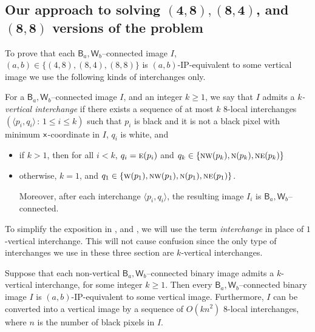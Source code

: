 \documentclass[lotsofwhite,charterfonts]{patmorin}
\newcommand{\N}{\textsc{n}}
\newcommand{\NE}{\textsc{ne}}
\newcommand{\E}{\textsc{e}}
\newcommand{\W}{\textsc{w}}
\newcommand{\NW}{\textsc{nw}}
\newcommand{\x}{\ensuremath{\protect\textup{\textsf{x}}}}
\newcommand{\ic}[2]{\langle #1,#2 \rangle}
\begin{document}
\subsection{Our approach to solving $\mathbf{(4,8), (8,4)}$, and
$\mathbf{(8,8)}$ versions of the problem}

To prove that each $\textsf{B}_a,\textsf{W}_b$--connected image $I$,
$(a,b)\in \{(4,8), (8,4), (8,8)\}$ is $(a,b)$-IP-equivalent to some
vertical image we use the following kinds of interchanges only.

For a $\textsf{B}_a,\textsf{W}_b$--connected image $I$, and an integer
$k\geq 1$, we say that $I$ admits a \emph{$k$-vertical interchange} if
there exists a sequence of at most $k$ $8$-local interchanges
$(\ic{p_i}{q_i}\, :\, 1\leq i\leq k)$ such that $p_i$ is black and it
is not a black pixel  with minimum \x-coordinate in $I$, $q_i$ is
white, and 

\begin{itemize} 

\item if $k>1$, then for all $i<k$, $q_i=\E(p_i)$ and
$q_k\in\{\NW(p_k),\N(p_k),\NE(p_k)\}$ 

\item otherwise, $k=1$, and
$q_1\in\{\W(p_1),\NW(p_1),\N(p_1),\NE(p_1)\}$.

Moreover, after each interchange $\ic{p_i}{q_i}$, the resulting
image $I_i$ is $\textsf{B}_a,\textsf{W}_b$--connected. 
\end{itemize}

To simplify the exposition in , 
and , we will use the term \emph{interchange} in
place of $1$-vertical interchange. This will not cause confusion since
the only type of interchanges we use in these three section are
$k$-vertical interchanges.

\begin{lem} 
Suppose that each non-vertical $\textsf{B}_a,\textsf{W}_b$--connected
binary image admits a $k$-vertical interchange, for some integer
$k\geq 1$. Then every $\textsf{B}_a,\textsf{W}_b$--connected binary
image $I$ is $(a,b)$-IP-equivalent to some vertical image.
Furthermore, $I$ can be converted into a vertical image by a sequence
of $O(kn^2)$ 8-local interchanges, where $n$ is the number of black
pixels in $I$.
\end{lem}
\end{document}
